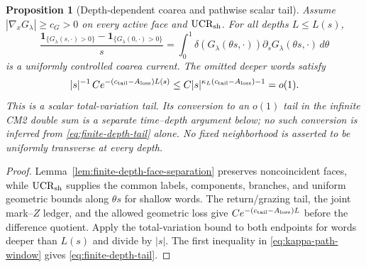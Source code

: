 \documentclass[11pt]{article}
\newtheorem{proposition}[theorem]{Proposition}
\newcommand{\one}{\mathbf 1}
\begin{document}
\begin{proposition}[Depth-dependent coarea and pathwise scalar tail]
\label{prop:parameter-state-master-refinement}
Assume $|\nabla_xG_\lambda|\ge c_G>0$ on every active face and
$\mathrm{UCR}_{\rm sh}$.  For all depths
$L\le L(s)$,
\begin{equation}
\label{eq:master-coarea-difference}
 \frac{\one_{\{G_\lambda(s,\cdot)>0\}}
             -\one_{\{G_\lambda(0,\cdot)>0\}}}{s}
 =\int_0^1\delta(G_\lambda(\theta s,\cdot))
   \partial_sG_\lambda(\theta s,\cdot)\,d\theta
\end{equation}
is a uniformly controlled coarea current.  The omitted deeper words satisfy
\begin{equation}
\label{eq:finite-depth-tail}
 |s|^{-1}\,Ce^{-(c_{\rm tail}-A_{\rm loss})L(s)}
 \le C|s|^{\kappa_L(c_{\rm tail}-A_{\rm loss})-1}=o(1).
\end{equation}
This is a scalar total-variation tail.  Its conversion to an $o(1)$ tail in
the infinite CM2 double sum is a separate time--depth argument below; no such
conversion is inferred from \eqref{eq:finite-depth-tail} alone.  No fixed
neighborhood is asserted to be uniformly transverse at every depth.
\end{proposition}

\begin{proof}
Lemma~\ref{lem:finite-depth-face-separation} preserves noncoincident faces,
while $\mathrm{UCR}_{\rm sh}$ supplies the common labels, components, branches, and
uniform geometric bounds along $\theta s$ for shallow words.  The return/grazing tail,
the joint mark--$Z$ ledger, and the allowed geometric loss give
$Ce^{-(c_{\rm tail}-A_{\rm loss})L}$ before the difference quotient.  Apply
the total-variation bound to both endpoints for words deeper than $L(s)$ and
divide by $|s|$.  The first inequality in
\eqref{eq:kappa-path-window} gives \eqref{eq:finite-depth-tail}.
\end{proof}
\end{document}
